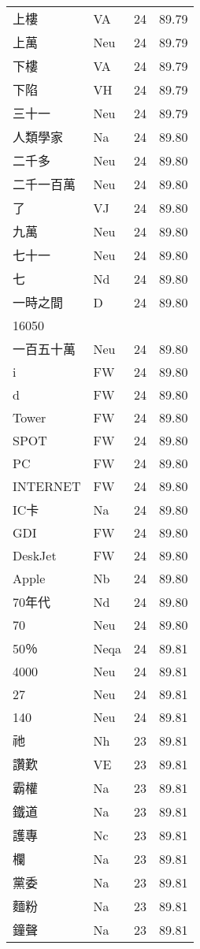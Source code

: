 \documentclass[twocolumn]{book}
\begin{document}
\begin{supertabular}{llrr}
上樓 & VA & 24 &  89.79\\
上萬 & Neu & 24 &  89.79\\
下樓 & VA & 24 &  89.79\\
下陷 & VH & 24 &  89.79\\
三十一 & Neu & 24 &  89.79\\
人類學家 & Na & 24 &  89.80\\
二千多 & Neu & 24 &  89.80\\
二千一百萬 & Neu & 24 &  89.80\\
了 & VJ & 24 &  89.80\\
九萬 & Neu & 24 &  89.80\\
七十一 & Neu & 24 &  89.80\\
七 & Nd & 24 &  89.80\\
一時之間 & D & 24 &  89.80\\
16050\\
一百五十萬 & Neu & 24 &  89.80\\
i & FW & 24 &  89.80\\
d & FW & 24 &  89.80\\
Tower & FW & 24 &  89.80\\
SPOT & FW & 24 &  89.80\\
PC & FW & 24 &  89.80\\
INTERNET & FW & 24 &  89.80\\
IC卡 & Na & 24 &  89.80\\
GDI & FW & 24 &  89.80\\
DeskJet & FW & 24 &  89.80\\
Apple & Nb & 24 &  89.80\\
70年代 & Nd & 24 &  89.80\\
70 & Neu & 24 &  89.80\\
50％ & Neqa & 24 &  89.81\\
4000 & Neu & 24 &  89.81\\
27 & Neu & 24 &  89.81\\
140 & Neu & 24 &  89.81\\
祂 & Nh & 23 &  89.81\\
讚歎 & VE & 23 &  89.81\\
霸權 & Na & 23 &  89.81\\
鐵道 & Na & 23 &  89.81\\
護專 & Nc & 23 &  89.81\\
欄 & Na & 23 &  89.81\\
黨委 & Na & 23 &  89.81\\
麵粉 & Na & 23 &  89.81\\
鐘聲 & Na & 23 &  89.81\\

\end{supertabular}
\end{document}
